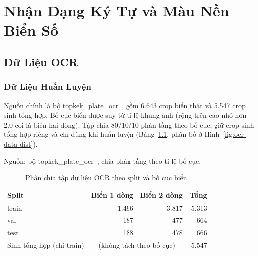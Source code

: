 \chapter{Nhận Dạng Ký Tự và Màu Nền Biển Số}
\label{ch:ocr}

\section{Dữ Liệu OCR}
\label{sec:ocr-dulieu}

\subsection{Dữ Liệu Huấn Luyện}

Nguồn chính là bộ topkek\_plate\_ocr~\autocite{topkek2024vnplateocr}, gồm 6.643 crop biển thật
và 5.547 crop sinh tổng hợp. Bố cục
biển được suy từ tỉ lệ khung ảnh (rộng trên cao nhỏ hơn 2,0 coi là biển hai dòng). Tập chia
80/10/10 phân tầng theo bố cục, giữ crop sinh tổng hợp riêng và chỉ dùng khi huấn luyện
(Bảng~\ref{tab:ocr-split}, phân bố ở Hình~\ref{fig:ocr-data-dist}).

\begin{table}[htbp]
\centering
\caption{Phân chia tập dữ liệu OCR theo split và bố cục biển.}

{\footnotesize Nguồn: bộ topkek\_plate\_ocr~\autocite{topkek2024vnplateocr}, chia phân tầng theo tỉ lệ bố cục.}
\label{tab:ocr-split}
\begin{tabular}{lrrr}
\toprule
Split & Biển 1 dòng & Biển 2 dòng & Tổng \\
\midrule
train & 1.496 & 3.817 & 5.313 \\
val   & 187   & 477   & 664   \\
test  & 188   & 478   & 666   \\
Sinh tổng hợp (chỉ train) & \multicolumn{2}{c}{(không tách theo bố cục)} & 5.547 \\
\bottomrule
\end{tabular}
\end{table}


